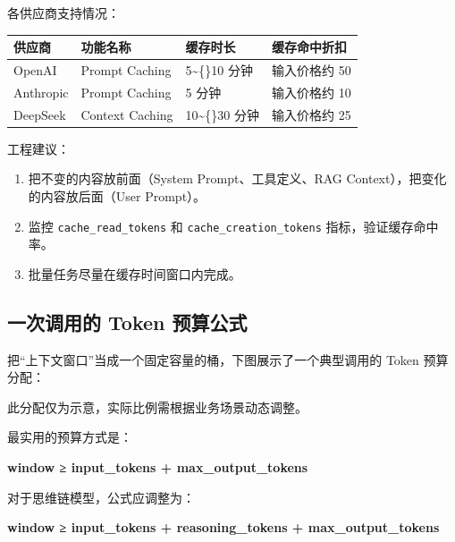 \documentclass[9pt,a4paper,twocolumn]{ctexart}
\begin{document}
各供应商支持情况：


{\footnotesize
\begin{tabular}{|p{}|p{}|p{}|p{}|}
\hline
\textbf{供应商} & \textbf{功能名称} & \textbf{缓存时长} & \textbf{缓存命中折扣} \\
\hline
OpenAI & Prompt Caching & 5\textasciitilde\{\}10 分钟 & 输入价格约 50\\%
\hline
Anthropic & Prompt Caching & 5 分钟 & 输入价格约 10\\%
\hline
DeepSeek & Context Caching & 10\textasciitilde\{\}30 分钟 & 输入价格约 25\\%
\hline
\end{tabular}
}



工程建议：


\begin{enumerate}[itemsep=1pt, topsep=2pt]
  \item 把不变的内容放前面（System Prompt、工具定义、RAG Context），把变化的内容放后面（User Prompt）。
  \item 监控 \texttt{cache\_read\_tokens} 和 \texttt{cache\_creation\_tokens} 指标，验证缓存命中率。
  \item 批量任务尽量在缓存时间窗口内完成。
\end{enumerate}


\subsection*{一次调用的 Token 预算公式}


把“上下文窗口”当成一个固定容量的桶，下图展示了一个典型调用的 Token 预算分配：



此分配仅为示意，实际比例需根据业务场景动态调整。



最实用的预算方式是：



\textbf{window ≥ input\_tokens + max\_output\_tokens}



对于思维链模型，公式应调整为：



\textbf{window ≥ input\_tokens + reasoning\_tokens + max\_output\_tokens}
\end{document}
